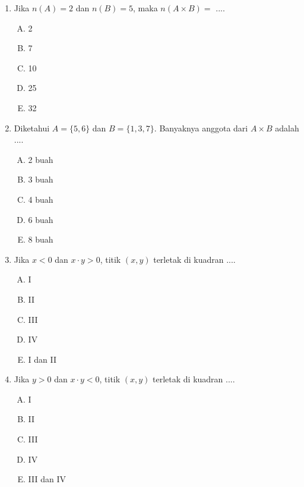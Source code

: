 \documentclass[fleqn, a4paper, 12pt]{article} %
\begin{document}
	\begin{enumerate}
		\item Jika $n(A) = 2$ dan $n(B) = 5$, maka $n(A \times B) = $ ....
		\begin{enumerate}[(A)]
			\item 2
			\item 7
			\item 10
			\item 25
			\item 32
		\end{enumerate}
		\item Diketahui $A = \{5, 6\}$ dan $B = \{1, 3, 7\}$. Banyaknya anggota dari $A \times B$ adalah ....
		\begin{enumerate}[(A)]
			\item 2 buah
			\item 3 buah
			\item 4 buah
			\item 6 buah
			\item 8 buah
		\end{enumerate}
		\item Jika $x < 0$ dan $x \cdot y > 0$, titik $(x, y)$ terletak di kuadran ....
		\begin{enumerate}[(A)]
			\item I
			\item II
			\item III
			\item IV
			\item I dan II
		\end{enumerate}
		
		\newpage
		
		\item Jika $y > 0$ dan $x \cdot y < 0$, titik $(x, y)$ terletak di kuadran ....
		\begin{enumerate}[(A)]
			\item I
			\item II
			\item III
			\item IV
			\item III dan IV
		\end{enumerate}
		

\end{enumerate}
\end{document}
